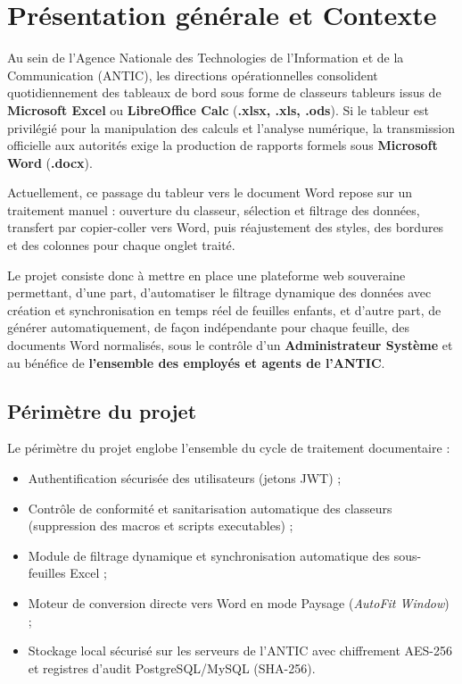 \chapter{Présentation générale et Contexte}

Au sein de l'Agence Nationale des Technologies de l'Information et de la Communication (ANTIC), les directions opérationnelles consolident quotidiennement des tableaux de bord sous forme de classeurs tableurs issus de \textbf{Microsoft Excel} ou \textbf{LibreOffice Calc} (\textbf{.xlsx, .xls, .ods}). Si le tableur est privilégié pour la manipulation des calculs et l'analyse numérique, la transmission officielle aux autorités exige la production de rapports formels sous \textbf{Microsoft Word} (\textbf{.docx}).

Actuellement, ce passage du tableur vers le document Word repose sur un traitement manuel : ouverture du classeur, sélection et filtrage des données, transfert par copier-coller vers Word, puis réajustement des styles, des bordures et des colonnes pour chaque onglet traité.

Le projet consiste donc à mettre en place une plateforme web souveraine permettant, d'une part, d'automatiser le filtrage dynamique des données avec création et synchronisation en temps réel de feuilles enfants, et d'autre part, de générer automatiquement, de façon indépendante pour chaque feuille, des documents Word normalisés, sous le contrôle d'un \textbf{Administrateur Système} et au bénéfice de \textbf{l'ensemble des employés et agents de l'ANTIC}.

\section{Périmètre du projet}

Le périmètre du projet englobe l'ensemble du cycle de traitement documentaire :
\begin{itemize}
    \item Authentification sécurisée des utilisateurs (jetons JWT) ;
    \item Contrôle de conformité et sanitarisation automatique des classeurs (suppression des macros et scripts executables) ;
    \item Module de filtrage dynamique et synchronisation automatique des sous-feuilles Excel ;
    \item Moteur de conversion directe vers Word en mode Paysage (\textit{AutoFit Window}) ;
    \item Stockage local sécurisé sur les serveurs de l'ANTIC avec chiffrement AES-256 et registres d'audit PostgreSQL/MySQL (SHA-256).
\end{itemize}

